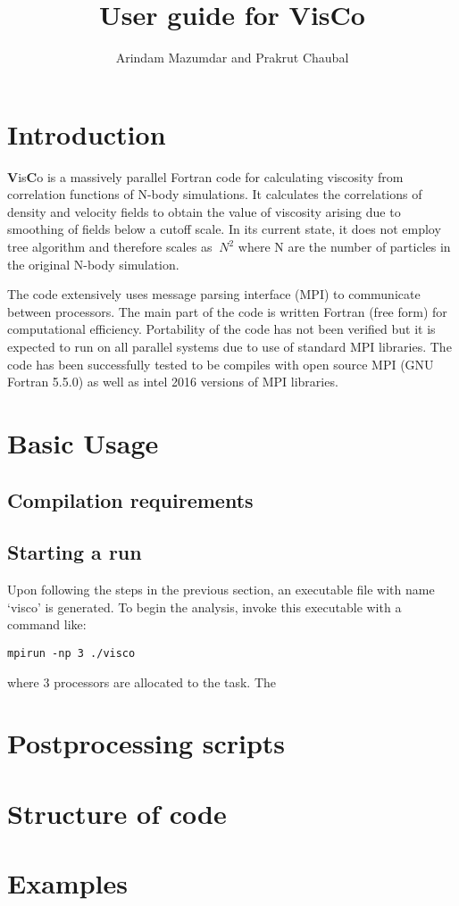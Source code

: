 \documentclass[11pt]{article}
\begin{document}
\title{User guide for VisCo}
\author{Arindam Mazumdar and Prakrut Chaubal}
\maketitle
\tableofcontents
\newpage

\section{Introduction}
\textbf{V}is\textbf{C}o is a massively parallel Fortran code for calculating viscosity from correlation functions of N-body simulations. It calculates the correlations of density and velocity fields to obtain the value of viscosity arising due to smoothing of fields below a cutoff scale. In its current state, it does not employ tree algorithm and therefore scales as $~ N^2$ where N are the number of particles in the original N-body simulation.

The code extensively uses message parsing interface (MPI) to communicate between processors. The main part of the code is written Fortran (free form) for computational efficiency. Portability of the code has not been verified but it is expected to run on all parallel systems due to use of standard MPI libraries. The code has been successfully tested to be compiles with open source MPI (GNU Fortran 5.5.0) as well as intel 2016 versions of MPI libraries.

\newpage
\section{Basic Usage}
\subsection{Compilation requirements}

\subsection{Starting a run}
Upon following the steps in the previous section, an executable file with name `visco' is generated. To begin the analysis, invoke this executable with a command like:

\texttt{mpirun -np 3 ./visco }

where 3 processors are allocated to the task. The 



\newpage
\section{Postprocessing scripts}

\newpage
\section{Structure of code}

\newpage
\section{Examples}
\end{document}
